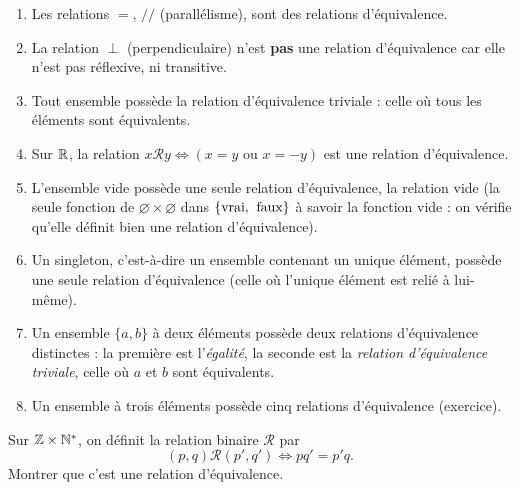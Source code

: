 \begin{exemples}
\begin{enumerate}[label=\alph*)]
\item Les relations $=$, $//$ (parallélisme), sont des relations d'équivalence.
\item La relation $\perp$ (perpendiculaire) n'est \textbf{pas} une relation d'équivalence car elle n'est pas réflexive, ni transitive.
\item Tout ensemble possède la relation d'équivalence triviale : celle où tous les éléments sont équivalents.
\item Sur $\mathbb{R}$, la relation $x\mathcal R y \iff \left(x=y\text{ ou }x=-y\right)$ est une relation d'équivalence.
\item L'ensemble vide possède une seule relation d'équivalence, la relation vide (la seule fonction de $\varnothing \times \varnothing$ dans $\{\text{vrai,\: faux}\}$ à savoir la fonction vide : on vérifie qu'elle définit bien une relation d'équivalence).
\item Un singleton, c'est-à-dire un ensemble contenant un unique élément, possède une seule relation d'équivalence (celle où l'unique élément est relié à lui-même).
\item Un ensemble $\{a,b\}$ à deux éléments possède deux relations d'équivalence distinctes : la première est l'\emph{égalité}, la seconde est la \emph{relation d'équivalence triviale}, celle où $a$ et $b$ sont équivalents.
\item Un ensemble à trois éléments possède cinq relations d'équivalence (exercice).
\end{enumerate}
\end{exemples}

\begin{exercice}
Sur $\mathbb{Z}\times \mathbb{N}^*$, on définit la relation binaire $\mathcal R$ par
\[(p,q)\mathcal R (p',q') \iff pq'=p'q.\]
Montrer que c'est une relation d'équivalence.
\end{exercice}


